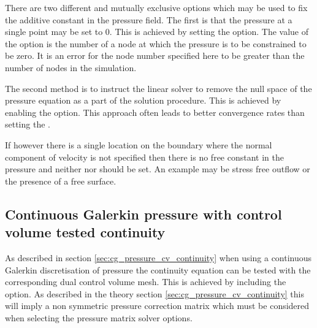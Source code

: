 There are two different and mutually exclusive options which may be used to
fix the additive constant in the pressure field. The first is that the
pressure at a single point may be set to 0. This is achieved by setting the
 option. The
value of the option is the number of a node at which the pressure is to be
constrained to be zero. It is an error for the node number specified here to
be greater than the number of nodes in the simulation.

The second method is to instruct the linear solver to remove the null space
of the pressure equation as a part of the solution procedure. This is
achieved by enabling the\linebreak
{}
option. This approach often leads to better convergence rates than setting
the .

If however there is a single location on the boundary where the normal
component of velocity is not specified then there is no free constant in the
pressure and neither  nor
 should be set. An example
may be stress free outflow or the presence of a free surface.

\subsection{Continuous Galerkin pressure with control volume tested continuity}
\label{sec:config_cg_pressure_cv_continuity}

As described in section \ref{sec:cg_pressure_cv_continuity} when using a continuous Galerkin 
discretisation of pressure the continuity equation can be tested with the corresponding 
dual control volume mesh. This is achieved by including the \linebreak 
{}
option. As described in the theory section \ref{sec:cg_pressure_cv_continuity} this will imply a 
non symmetric pressure correction matrix which must be considered when selecting the pressure 
matrix solver options.

